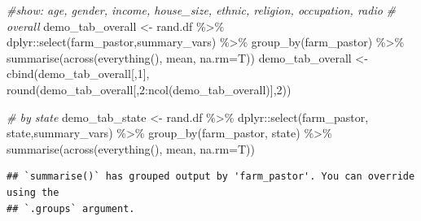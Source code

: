 \documentclass[
]{article}
\newenvironment{Shaded}{\begin{snugshade}}{\end{snugshade}}
\newcommand{\AttributeTok}[1]{\textcolor[rgb]{0.77,0.63,0.00}{#1}}
\newcommand{\CommentTok}[1]{\textcolor[rgb]{0.56,0.35,0.01}{\textit{#1}}}
\newcommand{\DecValTok}[1]{\textcolor[rgb]{0.00,0.00,0.81}{#1}}
\newcommand{\FunctionTok}[1]{\textcolor[rgb]{0.00,0.00,0.00}{#1}}
\newcommand{\NormalTok}[1]{#1}
\newcommand{\OtherTok}[1]{\textcolor[rgb]{0.56,0.35,0.01}{#1}}
\newcommand{\SpecialCharTok}[1]{\textcolor[rgb]{0.00,0.00,0.00}{#1}}
\begin{document}
\begin{Shaded}
\begin{Highlighting}[]
\CommentTok{\#show: age, gender, income, house\_size, ethnic, religion, occupation, radio}
\CommentTok{\# overall}
\NormalTok{demo\_tab\_overall }\OtherTok{\textless{}{-}}\NormalTok{ rand.df }\SpecialCharTok{\%\textgreater{}\%}\NormalTok{ dplyr}\SpecialCharTok{::}\FunctionTok{select}\NormalTok{(farm\_pastor,summary\_vars) }\SpecialCharTok{\%\textgreater{}\%}
  \FunctionTok{group\_by}\NormalTok{(farm\_pastor) }\SpecialCharTok{\%\textgreater{}\%}
  \FunctionTok{summarise}\NormalTok{(}\FunctionTok{across}\NormalTok{(}\FunctionTok{everything}\NormalTok{(), mean, }\AttributeTok{na.rm=}\NormalTok{T))}
\NormalTok{demo\_tab\_overall }\OtherTok{\textless{}{-}} \FunctionTok{cbind}\NormalTok{(demo\_tab\_overall[,}\DecValTok{1}\NormalTok{], }\FunctionTok{round}\NormalTok{(demo\_tab\_overall[,}\DecValTok{2}\SpecialCharTok{:}\FunctionTok{ncol}\NormalTok{(demo\_tab\_overall)],}\DecValTok{2}\NormalTok{))}

\CommentTok{\# by state}
\NormalTok{demo\_tab\_state }\OtherTok{\textless{}{-}}\NormalTok{ rand.df }\SpecialCharTok{\%\textgreater{}\%}\NormalTok{ dplyr}\SpecialCharTok{::}\FunctionTok{select}\NormalTok{(farm\_pastor, state,summary\_vars) }\SpecialCharTok{\%\textgreater{}\%}
  \FunctionTok{group\_by}\NormalTok{(farm\_pastor, state) }\SpecialCharTok{\%\textgreater{}\%}
  \FunctionTok{summarise}\NormalTok{(}\FunctionTok{across}\NormalTok{(}\FunctionTok{everything}\NormalTok{(), mean, }\AttributeTok{na.rm=}\NormalTok{T))}
\end{Highlighting}
\end{Shaded}

\begin{verbatim}
## `summarise()` has grouped output by 'farm_pastor'. You can override using the
## `.groups` argument.
\end{verbatim}
\end{document}
